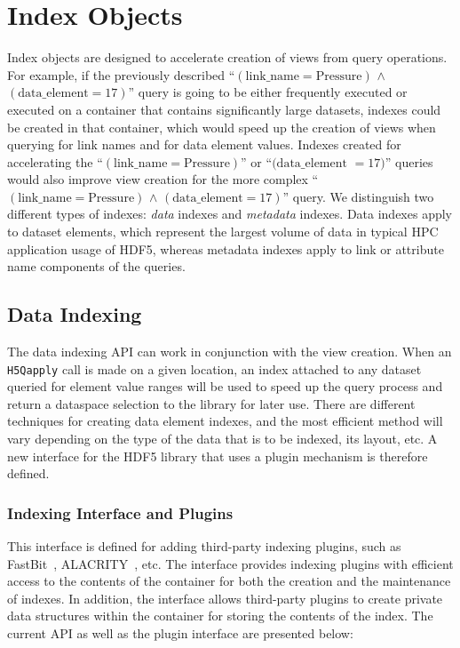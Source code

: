 
\section{Index Objects}
Index objects are designed to accelerate creation of views from query operations.
For example, if the previously described ``$\mathrm{(link\_name = Pressure)}$
$\mathrm{\land}$ $\mathrm{(data\_element = 17)}$'' query
is going to be either frequently executed or executed
on a container that contains significantly large datasets, indexes
could be created in that container, which would speed up the
creation of views when querying for link names and for data element values.
Indexes created for accelerating the  ``$\mathrm{(link\_name = Pressure)}$'' or
``$\mathrm{(data\_element}$ $\mathrm{= 17)}$'' queries
would also improve view creation for the more complex
``$\mathrm{(link\_name = Pressure)}$ $\mathrm{\land}$
$\mathrm{(data\_element = 17)}$'' query.
We distinguish two different types of indexes: \textit{data} indexes and
\textit{metadata} indexes. Data indexes apply to dataset elements, which
represent the largest volume of data in typical HPC application usage of HDF5,
whereas metadata indexes apply to link or attribute name components of the queries.

\subsection{Data Indexing}

The data indexing API can work in conjunction with the view creation. When an \texttt{H5Qapply}
call is made on a given location, an index attached to any dataset queried
for element value ranges will be used to speed up the query process and return
a dataspace selection to the library for later use.
There are different techniques for creating data element indexes, and the most
efficient method will vary depending on the type of the data that is to be
indexed, its layout, etc. A new interface for the HDF5 library that uses a
plugin mechanism is therefore defined.

\subsubsection{Indexing Interface and Plugins}

This interface is defined for adding third-party indexing plugins,
such as FastBit~\cite{Wu05}, ALACRITY~\cite{alacrity13}, etc.
The interface provides indexing plugins with efficient access to the contents of
the container for both the creation and the maintenance of indexes. In addition,
the interface allows third-party plugins to create private data structures
within the container for storing the contents of the index.
The current API as well as the plugin interface are presented below:


